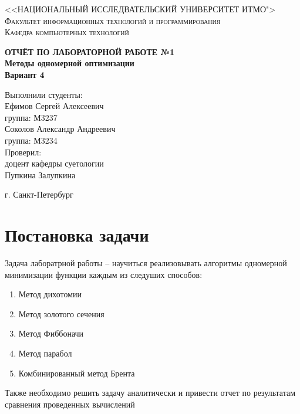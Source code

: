 \documentclass[a4paper, 14pt]{article}
\begin{document}
	\renewcommand{\chaptername}{Лабораторная работа}
	\def\contentsname{Содержание}

	\begin{titlepage}
		\begin{center}
			\textsc{<<НАЦИОНАЛЬНЫЙ ИССЛЕДВАТЕЛЬСКИЙ УНИВЕРСИТЕТ ИТМО">\\[5mm]
			Факультет информационных технологий и программирования\\[2mm]
			Кафедра компьютерных технологий}

			\vfill

			\textbf{ОТЧЁТ ПО ЛАБОРАТОРНОЙ РАБОТЕ №1\\[3mm]
			Методы одномерной оптимизации\\[6mm]
			Вариант 4
			\\[20mm]
			}
		\end{center}

		\hfill
		\begin{minipage}{.5\textwidth}
			Выполнили студенты:\\[2mm]
			Ефимов Сергей Алексеевич\\
			группа: М3237\\[2mm]
			Соколов Александр Андреевич\\
			группа: М3234\\[5mm]

			Проверил:\\[2mm]
			доцент кафедры суетологии\\
			Пупкина Залупкина
		\end{minipage}%
		\vfill
		\begin{center}
			г. Санкт-Петербург
		\end{center}
	\end{titlepage}


	\section*{Постановка задачи}
	Задача лаборатрной работы  -- научиться реализовывать алгоритмы одномерной минимизации функции каждым из следуших способов:
	\begin{enumerate}
		\item Метод дихотомии
		\item Метод золотого сечения
		\item Метод Фиббоначи
		\item Метод парабол
		\item Комбинированный метод Брента
	\end{enumerate}
	Также необходимо решить задачу аналитически и привести отчет по результатам сравнения проведенных вычислений
\end{document}
